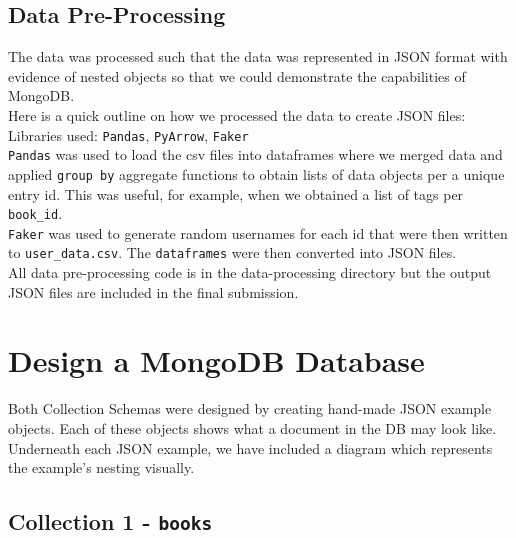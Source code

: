 \documentclass[11pt]{article}
\begin{document}
\subsection{Data Pre-Processing}
\label{sec:orgd10970e}
The data was processed such that the data was represented in JSON format with evidence of nested objects so that we could demonstrate the capabilities of MongoDB.\\
\linebreak
Here is a quick outline on how we processed the data to create JSON files:\\
Libraries used: \texttt{Pandas}, \texttt{PyArrow}, \texttt{Faker}\\
\linebreak
\texttt{Pandas} was used to load the csv files into dataframes where we merged data and applied \texttt{group by} aggregate functions to obtain lists of data objects per a unique entry id. This was useful, for example, when we obtained a list of tags per \texttt{book\_id}.\\
\linebreak
\texttt{Faker} was used to generate random usernames for each id that were then written to \texttt{user\_data.csv}. The \texttt{dataframes} were then converted into JSON files.\\
\linebreak
All data pre-processing code is in the data-processing directory but the output JSON files are included in the final submission.
\section{Design a MongoDB Database}
\label{sec:org9bc5fd6}
Both Collection Schemas were designed by creating hand-made JSON example objects. Each of these objects shows what a document in the DB may look like. Underneath each JSON example, we have included a diagram which represents the example's nesting visually.
\subsection{Collection 1 - \texttt{books}}
\label{sec:org8a0ca44}
\end{document}
